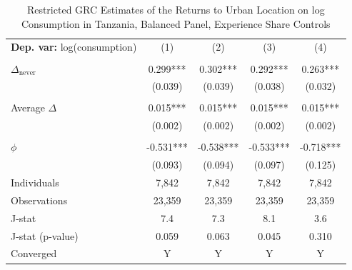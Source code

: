 \begin{table}[htbp] \centering \begin{threeparttable}
 \caption{Restricted GRC Estimates of the Returns to Urban Location on log Consumption in Tanzania, Balanced Panel, Experience Share Controls} 
 \label{tab:GRC_TZA_consumption_urban_bal_exp_sh} 
\begin{tabular}{l cccc} \toprule  \textbf{Dep. var:}  log(consumption) 
                    &\multicolumn{1}{c}{(1)}   &\multicolumn{1}{c}{(2)}   &\multicolumn{1}{c}{(3)}   &\multicolumn{1}{c}{(4)}   \\
                    &               &               &               &               \\
\addlinespace
$\Delta_{\text{never}}$&       0.299***&       0.302***&       0.292***&       0.263***\\
                    &     (0.039)   &     (0.039)   &     (0.038)   &     (0.032)   \\
                    &               &               &               &               \\
\addlinespace
Average $\Delta$    &       0.015***&       0.015***&       0.015***&       0.015***\\
                    &     (0.002)   &     (0.002)   &     (0.002)   &     (0.002)   \\
                    &               &               &               &               \\
\addlinespace
$\phi$              &      -0.531***&      -0.538***&      -0.533***&      -0.718***\\
                    &     (0.093)   &     (0.094)   &     (0.097)   &     (0.125)   \\
\addlinespace
Individuals         &       7,842   &       7,842   &       7,842   &       7,842   \\
Observations        &      23,359   &      23,359   &      23,359   &      23,359   \\
J-stat              &         7.4   &         7.3   &         8.1   &         3.6   \\
J-stat (p-value)    &       0.059   &       0.063   &       0.045   &       0.310   \\
Converged           &           Y   &           Y   &           Y   &           Y   \\

\end{tabular}
\end{threeparttable}
\end{table}
